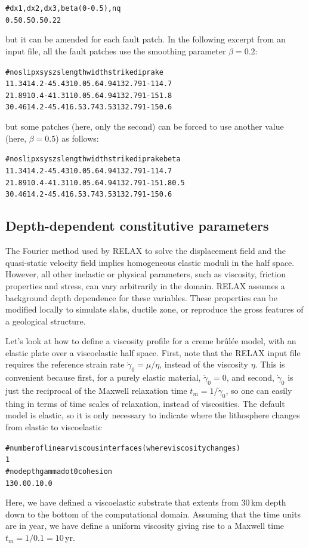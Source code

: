 \documentclass[10pt]{article}
\begin{document}
\begin{alltt}
# dx1,dx2,dx3,beta (0-0.5),nq
0.5 0.5 0.5 {\color{orange}0.2} 2
\end{alltt}
but it can be amended for each fault patch. In the following excerpt from an input file, all the fault patches use the smoothing parameter $\beta=0.2$:
\begin{alltt}
# no slip   xs     ys   zs length width strike dip   rake
   1 1.34 14.2 -45.43 10.0    5.6  4.94  132.7  91 -114.7
   2 1.89 10.4 -41.31 10.0    5.6  4.94  132.7  91 -151.8
   3 0.46 14.2 -45.41  6.5   3.74  3.53  132.7  91 -150.6
\end{alltt}
but some patches (here, only the second) can be forced to use another value (here, $\beta=0.5$) as follows:
\begin{alltt}
# no slip   xs     ys   zs length width strike dip   rake beta
   1 1.34 14.2 -45.43 10.0    5.6  4.94  132.7  91 -114.7
   2 1.89 10.4 -41.31 10.0    5.6  4.94  132.7  91 -151.8  {\color{orange}0.5}
   3 0.46 14.2 -45.41  6.5   3.74  3.53  132.7  91 -150.6
\end{alltt}

\subsection{Depth-dependent constitutive parameters}

The Fourier method used by RELAX to solve the displacement field and the quasi-static velocity field implies homogeneous elastic moduli in the half space. However, all other inelastic or physical parameters, such as viscosity, friction properties and stress, can vary arbitrarily in the domain. RELAX assumes a background depth dependence for these variables. These properties can be modified locally to simulate slabs, ductile zone, or reproduce the gross features of a geological structure. 

Let's look at how to define a viscosity profile for a creme br\^{u}l\'{e}e model, with an elastic plate over a viscoelastic half space. First, note that the RELAX input file requires the reference strain rate $\dot{\gamma}_0=\mu/\eta$, instead of the viscosity $\eta$. This is convenient because first, for a purely elastic material, $\dot{\gamma}_0=0$, and second, $\dot{\gamma}_0$ is just the reciprocal of the Maxwell relaxation time $t_m=1/\dot{\gamma}_0$, so one can easily thing in terms of time scales of relaxation, instead of viscosities. The default model is elastic, so it is only necessary to indicate where the lithosphere changes from elastic to viscoelastic
\begin{alltt}
# number of linear viscous interfaces (where viscosity changes)
{\color{orange}1}
# no depth gammadot0 cohesion
{\color{orange}   1  30.0       0.1      0.0}
\end{alltt}
Here, we have defined a viscoelastic substrate that extents from 30\,km depth down to the bottom of the computational domain. Assuming that the time units are in year, we have define a uniform viscosity giving rise to a Maxwell time $t_m=1/0.1=10\,$yr.
\end{document}

